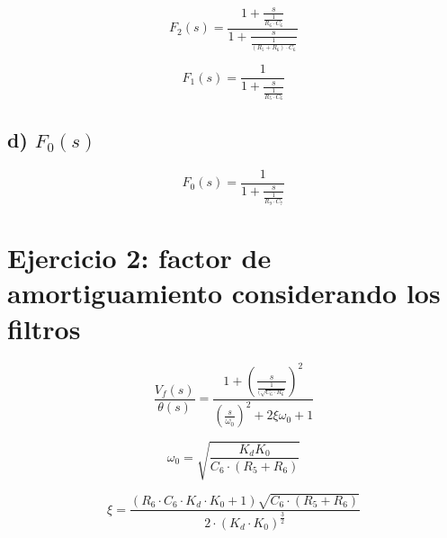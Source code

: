 \documentclass{article}
\begin{document}
\begin{equation} \label{f2_eqn}
F_2(s) = \frac{1+\frac{s}{\frac{1}{R_6 \cdot C_6}}}{ 1 + \frac{s}{\frac{1}{\left(R_5+R_6\right)\cdot C_6}}}
\end{equation}

\begin{equation} \label{f1_eqn}
F_1(s) = \frac{1}{ 1 + \frac{s}{\frac{1}{R_5\cdot C_6}}}
\end{equation}

\subsection*{d) $F_0(s)$}

\begin{equation} \label{fo_eqn}
F_0(s) = \frac{1}{ 1 + \frac{s}{\frac{1}{R_9\cdot C_7}}}
\end{equation}


\section*{Ejercicio 2: factor de amortiguamiento considerando los filtros}


\begin{equation} \label{vftheta_eqn}
\frac{V_f(s)}{\theta(s)} = 
\frac{ 1 + \left(\frac{s}{\frac{1}{(\sqrt{C_6\cdot R_6}}}\right)^2 }
{ \left(\frac{s}{\omega_0}\right)^2 + 2\xi \omega_0 + 1}
\end{equation}

\begin{equation} \label{w0_eqn}
\omega_0 = \sqrt{\frac{K_d K_0}{C_6\cdot(R_5+R_6)}}
\end{equation}


\begin{equation} \label{xi_eqn}
\xi = \frac{(R_6 \cdot C_6\cdot K_d\cdot K_0  + 1) \sqrt{C_6 \cdot(R_5+R_6)}}
{2\cdot(K_d\cdot K_0)^\frac{3}{2}}
\end{equation}
\end{document}
